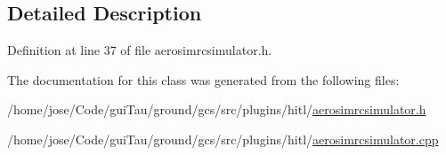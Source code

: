 \subsection{Detailed Description}


Definition at line 37 of file aerosimrcsimulator.\-h.



The documentation for this class was generated from the following files\-:\begin{DoxyCompactItemize}
\item 
/home/jose/\-Code/gui\-Tau/ground/gcs/src/plugins/hitl/\hyperlink{aerosimrcsimulator_8h}{aerosimrcsimulator.\-h}\item 
/home/jose/\-Code/gui\-Tau/ground/gcs/src/plugins/hitl/\hyperlink{aerosimrcsimulator_8cpp}{aerosimrcsimulator.\-cpp}\end{DoxyCompactItemize}
